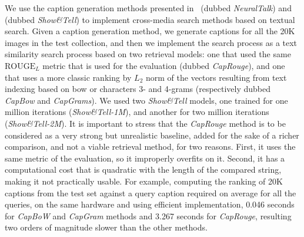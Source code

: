 We use the caption generation methods presented in~\cite{karpathy2015deep} (dubbed \emph{NeuralTalk}) and~\cite{vinyals2015show} (dubbed \emph{Show\&Tell}) to implement cross-media search methods based on textual search.
Given a caption generation method, we generate captions for all the 20K images in the test collection, and then we implement the search process as a text similarity search process based on two retrieval models: one that used the same $\text{ROUGE}_L$ metric that is used for the evaluation (dubbed \emph{CapRouge}), and one that uses a more classic ranking by $L_2$ norm of the vectors resulting from text indexing based on \acrlong{bow} or characters 3- and 4-grams (respectively dubbed \emph{CapBow} and \emph{CapGrams}).
We used two \emph{Show\&Tell} models, one trained for one million iterations (\emph{Show\&Tell-1M}), and another for two million iterations (\emph{Show\&Tell-2M}).
It is important to stress that the \emph{CapRouge} method is to be considered as a very strong but unrealistic baseline, added for the sake of a richer comparison, and not a viable retrieval method, for two reasons.
First, it uses the same metric of the evaluation, so it improperly overfits on it.
Second, it has a computational cost that is quadratic with the length of the compared string, making it not practically usable.
For example, computing the ranking of 20K captions from the test set against a query caption required on average for all the queries, on the same hardware and using efficient implementation, 0.046 seconds for \emph{CapBoW} and \emph{CapGram} methods and 3.267 seconds for \emph{CapRouge}, resulting two orders of magnitude slower than the other methods.


